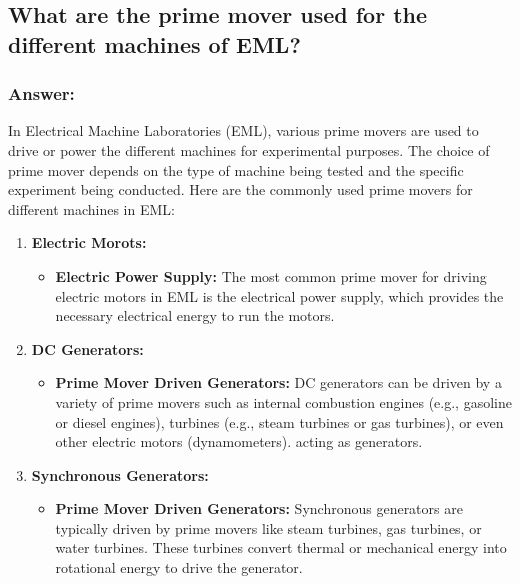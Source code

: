 \documentclass[12pt]{article}
\begin{document}
\vspace{0.5cm}
\subsection{What are the prime mover used for the different machines of EML?}
\subsubsection*{Answer:}
In Electrical Machine Laboratories (EML), various prime movers are used to drive or power the different machines for experimental purposes. The choice of prime mover depends on the type of machine being tested and the specific experiment being conducted. Here are the commonly used prime movers for different machines in EML:

\begin{enumerate}
    \item \textbf{Electric Morots:}
        \begin{itemize}
            \item \textbf{Electric Power Supply: } The most common prime mover for driving electric motors in EML is the electrical power supply, which provides the necessary electrical energy to run the motors.
        \end{itemize}
    \item \textbf{DC Generators:}
        \begin{itemize}
            \item \textbf{Prime Mover Driven Generators: } DC generators can be driven by a variety of prime movers such as internal combustion engines (e.g., gasoline or diesel engines), turbines (e.g., steam turbines or gas turbines), or even other electric motors (dynamometers). acting as generators.
        \end{itemize}
    \item \textbf{Synchronous Generators: }
        \begin{itemize}
            \item \textbf{Prime Mover Driven Generators: } Synchronous generators are typically driven by prime movers like steam turbines, gas turbines, or water turbines. These turbines convert thermal or mechanical energy into rotational energy to drive the generator.
        \end{itemize}


\end{enumerate}
\end{document}
